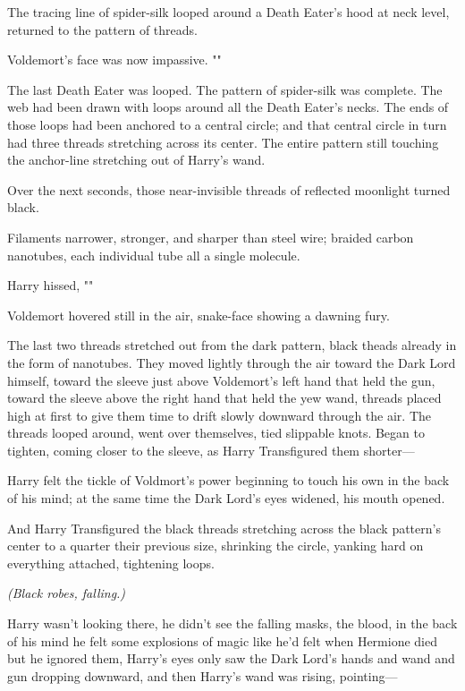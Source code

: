 The tracing line of spider-silk looped around a Death Eater's hood at neck
level, returned to the pattern of threads.

Voldemort's face was now impassive. ""

The last Death Eater was looped. The pattern of spider-silk was complete. The
web had been drawn with loops around all the Death Eater's necks. The ends of
those loops had been anchored to a central circle; and that central circle in
turn had three threads stretching across its center. The entire pattern still
touching the anchor-line stretching out of Harry's wand.

Over the next seconds, those near-invisible threads of reflected moonlight
turned black.

Filaments narrower, stronger, and sharper than steel wire; braided carbon
nanotubes, each individual tube all a single molecule.

Harry hissed, ""

Voldemort hovered still in the air, snake-face showing a dawning fury.

The last two threads stretched out from the dark pattern, black theads already
in the form of nanotubes. They moved lightly through the air toward the Dark
Lord himself, toward the sleeve just above Voldemort's left hand that held the
gun, toward the sleeve above the right hand that held the yew wand, threads
placed high at first to give them time to drift slowly downward through the
air. The threads looped around, went over themselves, tied slippable knots.
Began to tighten, coming closer to the sleeve, as Harry Transfigured them
shorter—

Harry felt the tickle of Voldmort's power beginning to touch his own in the
back of his mind; at the same time the Dark Lord's eyes widened, his mouth
opened.

And Harry Transfigured the black threads stretching across the black pattern's
center to a quarter their previous size, shrinking the circle, yanking hard on
everything attached, tightening loops.

\emph{(Black robes, falling.)}

Harry wasn't looking there, he didn't see the falling masks, the blood, in the
back of his mind he felt some explosions of magic like he'd felt when Hermione
died but he ignored them, Harry's eyes only saw the Dark Lord's hands and wand
and gun dropping downward, and then Harry's wand was rising, pointing—

